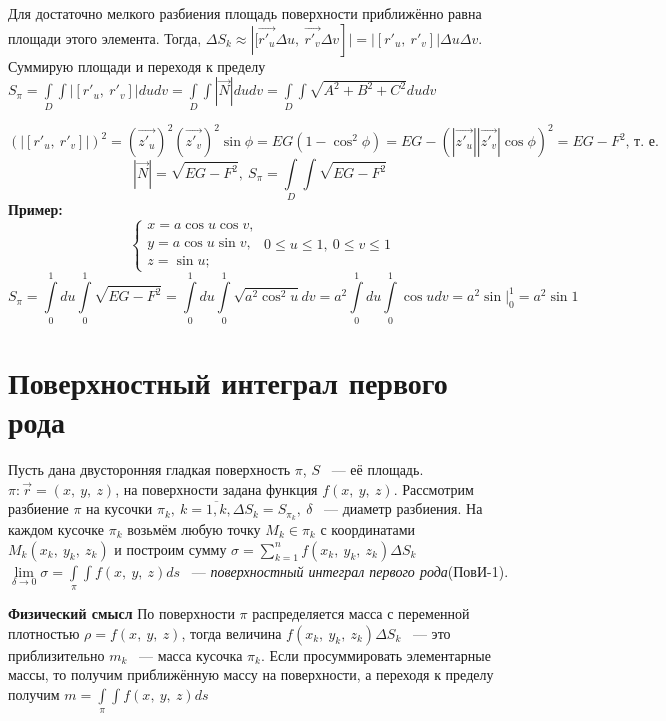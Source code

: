 \documentclass[../../main.tex]{subfiles}
\begin{document}
Для достаточно мелкого разбиения площадь поверхности приближённо равна площади 
этого элемента. Тогда, $\Delta S_k \approx \left|[\vec{r'_u}\Delta u, \ 
\vec{r'_v}\Delta v\right]| = |\left[r'_u, \ r'_v\right]|\Delta u\Delta v$. 
Суммирую площади и переходя к пределу $S_\pi = \int\limits_D\int|\left[r'_u, \ 
r'_v\right]|dudv = \int\limits_D\int|\vec{N}|dudv = 
\int\limits_D\int\sqrt{A^2+B^2+C^2}dudv$

\[
(|\left[r'_u, \ r'_v\right]|)^2 = (\vec{z'_u})^2(\vec{z'_v})^2\sin\phi = EG(1 
- \cos^2\phi) = EG - (|\vec{z'_u}||\vec{z'_v}|\cos\phi)^2 = EG-F^2\text{, 
т.~е.}
\]
\[
|\vec{N}| = \sqrt{EG - F^2}, \ S_\pi = \int\limits_D\int\sqrt{EG - F^2}
\]
\textbf{Пример:}\\
\[
\begin{cases}
 x = a\cos u\cos v, \\
 y = a\cos u\sin v,\\
 z = \sin u;
\end{cases} \ 
0 \leq u \leq 1, \ 0 \leq v \leq 1
\]
\[
 S_\pi = \int\limits_0^1du\int\limits_0^1\sqrt{EG-F^2} = 
 \int\limits_0^1du\int\limits_0^1\sqrt{a^2\cos^2u}dv = 
 a^2\int\limits_0^1du\int\limits_0^1\cos udv = a^2\sin\big|_0^1 = a^2\sin 1
\]
\section{Поверхностный интеграл первого рода}

Пусть дана двусторонняя гладкая поверхность $\pi$, $S$ ~--- её площадь. $\pi : 
\vec{r} = (x, \ y, \ z)$, на поверхности задана функция $f(x, \ y, \ z)$. 
Рассмотрим разбиение $\pi$ на кусочки $\pi_k, \ k = \overline{1, k}, \Delta 
S_k = S_{\pi_k}, \ \delta$ ~--- диаметр разбиения. На каждом кусочке $\pi_k$ 
возьмём любую точку $M_k \in \pi_k$ с координатами $M_k(x_k, \ y_k, \ z_k)$ и 
построим сумму $\sigma = \sum\limits_{k = 1}^nf(x_k, \ y_k, \ z_k)\Delta S_k$\\
$\lim\limits_{\delta\rightarrow0}\sigma = \int\limits_\pi\int f(x, \ y, \ 
z)ds$ ~--- \emph{поверхностный интеграл первого рода}(ПовИ-1).

\textbf{Физический смысл}
По поверхности $\pi$ распределяется масса с переменной плотностью $\rho = f(x, 
\ y, \ z)$, тогда величина $f(x_k, \ y_k, \ z_k)\Delta S_k$ ~--- это 
приблизительно $m_k$ ~--- масса кусочка $\pi_k$. Если просуммировать 
элементарные массы, то получим приближённую массу на поверхности, а переходя к 
пределу получим $m = \int\limits_\pi\int f(x, \ y, \ z)ds$
\end{document}
